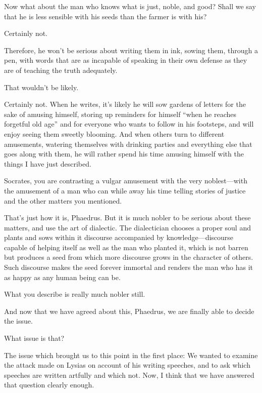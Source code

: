 \saysocrates Now what about the man who knows what is just, noble, and
good? Shall we say that he is less sensible with his seeds than the
farmer is with his?

\sayphaedrus Certainly not.

\saysocrates Therefore, he won't be serious about writing them in ink,
sowing them, through a pen, with words that are as incapable of speaking
in their own defense as they are of teaching the truth adequately.

\sayphaedrus That wouldn't be likely.

\saysocrates Certainly not. When he writes, it's likely he will sow gardens 
of letters for the sake of amusing himself, storing up reminders
for himself “when he reaches forgetful old age” and for everyone who
wants to follow in his footsteps, and will enjoy seeing them sweetly
blooming. And when others turn to different amusements, watering
themselves with drinking parties and everything else that goes along
with them, he will rather spend his time amusing himself with the things
I have just described.

\sayphaedrus Socrates, you are contrasting a vulgar amusement with the 
very noblest---with the amusement of a man who can while away
his time telling stories of justice and the other matters you mentioned.

\saysocrates That's just how it is, Phaedrus. But it is much nobler to be
serious about these matters, and use the art of dialectic. The
dialectician chooses a proper soul and plants and sows within it
discourse accompanied by knowledge---discourse capable of helping itself
as well as the man who planted it, which is not barren but produces a
seed from which more discourse grows in the character of
others. Such discourse makes the seed forever immortal and renders the
man who has it as happy as any human being can be.

\sayphaedrus What you describe is really much nobler still.

\saysocrates And now that we have agreed about this, Phaedrus, we are
finally able to decide the issue.

\sayphaedrus What issue is that?

\saysocrates The issue which brought us to this point in the first place:
We wanted to examine the attack made on Lysias on account of his writing speeches, and to ask which speeches are written artfully and
which not. Now, I think that we have answered that question clearly
enough.

